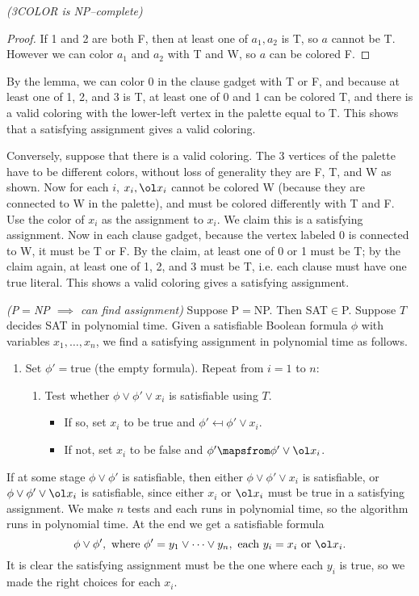 \begin{problem}{\it(3COLOR is NP--complete)}
\begin{proof}
If 1 and 2 are both F, then at least one of $a_1,a_2$ is T, so $a$ cannot be T. However we can color $a_1$ and $a_2$ with T and W, so $a$ can be colored F.
\end{proof}
By the lemma, we can color $0$ in the clause gadget with T or F, and because at least one of 1, 2, and 3 is T, at least one of 0 and 1 can be colored T, and there is a valid coloring with the lower-left vertex in the palette equal to T. This shows that a satisfying assignment gives a valid coloring.

Conversely, suppose that there is a valid coloring. The 3 vertices of the palette have to be different colors, without loss of generality they are F, T, and W as shown. Now for each $i$, $x_i,\ol x_i$ cannot be colored W (because they are connected to W in the palette), and must be colored differently with T and F. Use the color of $x_i$ as the assignment to $x_i$. We claim this is a satisfying assignment. Now in each clause gadget, because the vertex labeled 0 is connected to W, it must be T or F. By the claim, at least one of 0 or 1 must be T; by the claim again, at least one of 1, 2, and 3 must be T, i.e. each clause must have one true literal. This shows a valid coloring gives a satisfying assignment.
\end{problem}

\pagebreak

\begin{problem}{\it(P$=$NP $\implies$ can find assignment)}
Suppose P$=$NP. Then SAT$\in$P. Suppose $T$ decides SAT in polynomial time. Given a satisfiable Boolean formula $\phi$ with variables $x_1,\ldots, x_n$, we find a satisfying assignment in polynomial time as follows.
\begin{enumerate}
\item Set $\phi'=$true (the empty formula). Repeat from $i=1$ to $n$:
\begin{enumerate}
\item
Test whether $\phi\vee \phi' \vee x_i$ is satisfiable using $T$.
\begin{itemize}
\item
If so, set $x_i$ to be true and $\phi'\mapsfrom \phi'\vee x_i$.
\item
If not, set $x_i$ to be false and $\phi'\mapsfrom \phi'\vee \ol x_i$.
\end{itemize}
\end{enumerate}
\end{enumerate}
If at some stage $\phi\vee \phi'$ is satisfiable, then either $\phi\vee\phi'\vee x_i$ is satisfiable, or $\phi\vee \phi'\vee \ol x_i$ is satisfiable, since either $x_i$ or $\ol x_i$ must be true in a satisfying assignment. We make $n$ tests and each runs in polynomial time, so the algorithm runs in polynomial time. At the end we get a satisfiable formula
\[
\phi\vee \phi',\text{ where }\phi'=y_1\vee \cdots \vee y_n,\text{ each }y_i=x_i\text{ or }\ol x_i.
\]
It is clear the satisfying assignment must be the one where each $y_i$ is true, so we made the right choices for each $x_i$.
\end{problem}


